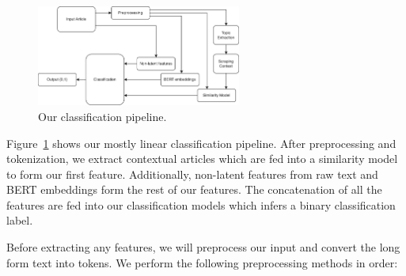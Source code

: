 \documentclass{article}
\begin{document}
\begin{minipage}{\textwidth}
  \begin{figure}
    \vspace*{-20pt}
    \centering
    \includegraphics[width=0.6\textwidth]{img/pipeline.png}
    \caption{Our classification pipeline.}
    \label{pipeline}
  \end{figure}

  Figure~\ref{pipeline} shows our mostly linear classification pipeline. After preprocessing and tokenization, we extract contextual articles which are fed into a similarity model to form our first feature. Additionally, non-latent features from raw text and BERT embeddings form the rest of our features. The concatenation of all the features are fed into our classification models which infers a binary classification label.
\end{minipage}

\label{section:preprocessing}

Before extracting any features, we will preprocess our input and convert the long form text into tokens. We perform the following preprocessing methods in order:
\end{document}
